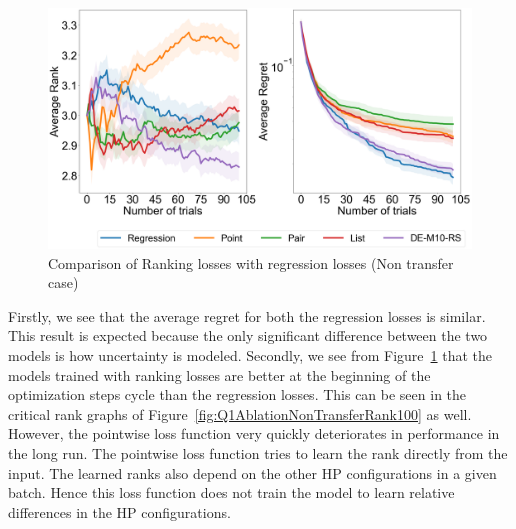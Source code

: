 \documentclass[12pt, twoside, ngerman]{report}
\begin{document}
\begin{figure}[h]
  \centering
    \includegraphics[scale=0.25]{images/Q1AblationNonTransfer}
    \caption{Comparison of Ranking losses with regression losses (Non transfer case)}
    \label{fig:Q1AblationNonTransfer}
\end{figure}

Firstly, we see that the average regret for both the regression losses is similar. This result is expected because the only significant difference between the two models is how uncertainty is modeled. Secondly,  we see from Figure~\ref{fig:Q1AblationNonTransfer} that the models trained with ranking losses are better at the beginning of the optimization steps cycle than the regression losses. This can be seen in the critical rank graphs of Figure~\ref{fig:Q1AblationNonTransferRank100} as well. However, the pointwise loss function very quickly deteriorates in performance in the long run. The pointwise loss function tries to learn the rank directly from the input. The learned ranks also depend on the other HP configurations in a given batch. Hence this loss function does not train the model to learn relative differences in the HP configurations.
\end{document}
